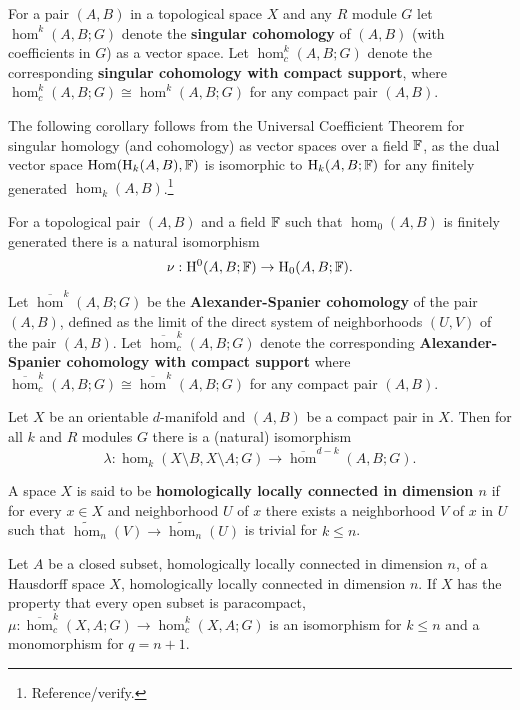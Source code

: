 
For a pair $(A, B)$ in a topological space $X$ and any $R$ module $G$ let $\hom^k(A, B; G)$ denote the \textbf{singular cohomology} of $(A,B)$ (with coefficients in $G$) as a vector space.
Let $\hom^k_c(A, B; G)$ denote the corresponding \textbf{singular cohomology with compact support}, where $\hom^k_c(A, B; G)\cong \hom^k(A, B; G)$ for any compact pair $(A,B)$.

The following corollary follows from the Universal Coefficient Theorem for singular homology (and cohomology) as vector spaces over a field $\mathbb{F}$, as the dual vector space $\mathrm{Hom}(\mathrm{H}_k(A, B), \mathbb{F})$ is isomorphic to $\mathrm{H}_k(A, B; \mathbb{F})$ for any finitely generated $\hom_k(A, B)$.\footnote{Reference/verify.}

\begin{corollary}\label{cor:univ_coef}
  For a topological pair $(A, B)$ and a field $\mathbb{F}$ such that $\hom_0(A, B)$ is finitely generated there is a natural isomorphism
  \[\nu : \mathrm{H}^0(A, B; \mathbb{F})\to \mathrm{H}_0(A, B; \mathbb{F}).\]
\end{corollary}

Let $\overline{\hom}^k(A, B; G)$ be the \textbf{Alexander-Spanier cohomology} of the pair $(A,B)$, defined as the limit of the direct system of neighborhoods $(U,V)$ of the pair $(A, B)$.
Let $\overline{\hom}^k_c(A, B; G)$ denote the corresponding \textbf{Alexander-Spanier cohomology with compact support} where $\overline{\hom}^k_c(A, B; G)\cong\overline{\hom}^k(A, B; G)$ for any compact pair $(A, B)$.

\begin{theorem}\label{thm:alexander}
  Let $X$ be an orientable $d$-manifold and $(A, B)$ be a compact pair in $X$.
  Then for all $k$ and $R$ modules $G$ there is a (natural) isomorphism
  \[\lambda : \hom_k(X\setminus B, X\setminus A; G)\to \overline{\hom}^{d-k}(A, B; G).\]
\end{theorem}

A space $X$ is said to be \textbf{homologically locally connected in dimension $n$} if for every $x\in X$ and neighborhood $U$ of $x$ there exists a neighborhood $V$ of $x$ in $U$ such that $\tilde{\hom}_n(V)\to\tilde{\hom}_n(U)$ is trivial for $k\leq n$.

\begin{lemma}\label{lem:alexander_iso}
  Let $A$ be a closed subset, homologically locally connected in dimension $n$, of a Hausdorff space $X$, homologically locally connected in dimension $n$.
  If $X$ has the property that every open subset is paracompact, $\mu : \overline{\hom}_c^k(X,A; G)\to \hom_c^k(X, A; G)$ is an isomorphism for $k\leq n$ and a monomorphism for $q = n+1$.
\end{lemma}

